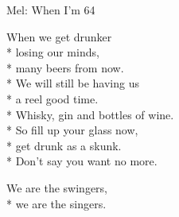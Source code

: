 \begin{SongText}
    \begin{SongInfo}
        Mel: When I'm 64
    \end{SongInfo}
    \begin{SongVerse}
        When we get drunker\\*%
        losing our minds,\\*%
        many beers from now.\\*%
        We will still be having us\\*%
        a reel good time.\\*%
        Whisky, gin and bottles of wine.\\*%
        So fill up your glass now,\\*%
        get drunk as a skunk.\\*%
        Don’t say you want no more.
    \end{SongVerse}
    \begin{SongVerse}
        We are the swingers,\\*%
        we are the singers.
    \end{SongVerse}
\end{SongText}